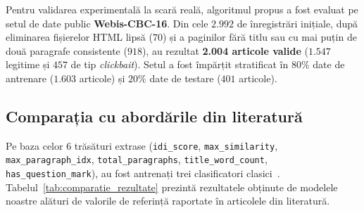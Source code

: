 \documentclass[12pt, a4paper]{article}
\begin{document}
Pentru validarea experimentală la scară reală, algoritmul propus a fost evaluat pe setul de date public \textbf{Webis-CBC-16}. Din cele $2.992$ de înregistrări inițiale, după eliminarea fișierelor HTML lipsă ($70$) și a paginilor fără titlu sau cu mai puțin de două paragrafe consistente ($918$), au rezultat \textbf{2.004 articole valide} ($1.547$ legitime și $457$ de tip \textit{clickbait}). Setul a fost împărțit stratificat în $80\%$ date de antrenare ($1.603$ articole) și $20\%$ date de testare ($401$ articole).

\subsection{Comparația cu abordările din literatură}

Pe baza celor $6$ trăsături extrase (\texttt{idi\_score}, \texttt{max\_similarity}, \texttt{max\_paragraph\_idx}, \texttt{total\_paragraphs}, \texttt{title\_word\_count}, \texttt{has\_question\_mark}), au fost antrenați trei clasificatori clasici~\cite{potthast2016, broscoteanu2023}. Tabelul~\ref{tab:comparatie_rezultate} prezintă rezultatele obținute de modelele noastre alături de valorile de referință raportate în articolele din literatură.

\begin{table}[htbp]
\centering
\caption{Comparație între rezultatele obținute prin metoda IDI (Webis-CBC-16) și literatura de specialitate}
\label{tab:comparatie_rezultate}
\renewcommand{\arraystretch}{1.25}
\end{table}
\end{document}
